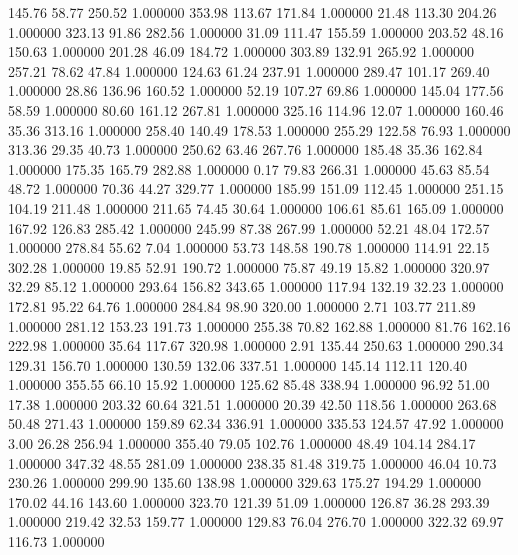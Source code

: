     145.76     58.77    250.52  1.000000
    353.98    113.67    171.84  1.000000
     21.48    113.30    204.26  1.000000
    323.13     91.86    282.56  1.000000
     31.09    111.47    155.59  1.000000
    203.52     48.16    150.63  1.000000
    201.28     46.09    184.72  1.000000
    303.89    132.91    265.92  1.000000
    257.21     78.62     47.84  1.000000
    124.63     61.24    237.91  1.000000
    289.47    101.17    269.40  1.000000
     28.86    136.96    160.52  1.000000
     52.19    107.27     69.86  1.000000
    145.04    177.56     58.59  1.000000
     80.60    161.12    267.81  1.000000
    325.16    114.96     12.07  1.000000
    160.46     35.36    313.16  1.000000
    258.40    140.49    178.53  1.000000
    255.29    122.58     76.93  1.000000
    313.36     29.35     40.73  1.000000
    250.62     63.46    267.76  1.000000
    185.48     35.36    162.84  1.000000
    175.35    165.79    282.88  1.000000
      0.17     79.83    266.31  1.000000
     45.63     85.54     48.72  1.000000
     70.36     44.27    329.77  1.000000
    185.99    151.09    112.45  1.000000
    251.15    104.19    211.48  1.000000
    211.65     74.45     30.64  1.000000
    106.61     85.61    165.09  1.000000
    167.92    126.83    285.42  1.000000
    245.99     87.38    267.99  1.000000
     52.21     48.04    172.57  1.000000
    278.84     55.62      7.04  1.000000
     53.73    148.58    190.78  1.000000
    114.91     22.15    302.28  1.000000
     19.85     52.91    190.72  1.000000
     75.87     49.19     15.82  1.000000
    320.97     32.29     85.12  1.000000
    293.64    156.82    343.65  1.000000
    117.94    132.19     32.23  1.000000
    172.81     95.22     64.76  1.000000
    284.84     98.90    320.00  1.000000
      2.71    103.77    211.89  1.000000
    281.12    153.23    191.73  1.000000
    255.38     70.82    162.88  1.000000
     81.76    162.16    222.98  1.000000
     35.64    117.67    320.98  1.000000
      2.91    135.44    250.63  1.000000
    290.34    129.31    156.70  1.000000
    130.59    132.06    337.51  1.000000
    145.14    112.11    120.40  1.000000
    355.55     66.10     15.92  1.000000
    125.62     85.48    338.94  1.000000
     96.92     51.00     17.38  1.000000
    203.32     60.64    321.51  1.000000
     20.39     42.50    118.56  1.000000
    263.68     50.48    271.43  1.000000
    159.89     62.34    336.91  1.000000
    335.53    124.57     47.92  1.000000
      3.00     26.28    256.94  1.000000
    355.40     79.05    102.76  1.000000
     48.49    104.14    284.17  1.000000
    347.32     48.55    281.09  1.000000
    238.35     81.48    319.75  1.000000
     46.04     10.73    230.26  1.000000
    299.90    135.60    138.98  1.000000
    329.63    175.27    194.29  1.000000
    170.02     44.16    143.60  1.000000
    323.70    121.39     51.09  1.000000
    126.87     36.28    293.39  1.000000
    219.42     32.53    159.77  1.000000
    129.83     76.04    276.70  1.000000
    322.32     69.97    116.73  1.000000
